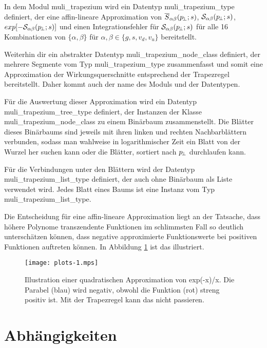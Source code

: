 In dem Modul muli\_trapezium wird ein Datentyp muli\_trapezium\_type definiert, der eine affin-lineare Approximation von $\overline{S}_{\alpha\beta}(p_{\!\perp};s)$, $\mathcal{S}_{\alpha\beta}(p_{\!\perp};s)$, $exp[-\mathcal{S}_{\alpha\beta}(p_{\!\perp};s)]$ und einen Integrationsfehler für $\mathcal{S}_{\alpha\beta}(p_{\!\perp};s)$ für alle 16 Kombinationen von $\{\alpha,\beta\}$ für $\alpha,\beta\in \{g,s,v_d,v_u\}$ bereitstellt.

Weiterhin dir ein abstrakter Datentyp muli\_trapezium\_node\_class definiert, der mehrere Segmente vom Typ muli\_trapezium\_type zusammenfasst und somit eine Approximation der Wirkungsquerschnitte entsprechend der Trapezregel bereitstellt. Daher kommt auch der name des Moduls und der Datentypen.

Für die Auswertung dieser Approximation wird ein Datentyp muli\_trapezium\_tree\_type definiert, der Instanzen der Klasse muli\_trapezium\_node\_class zu einem Binärbaum zusammenstellt. Die Blätter dieses Binärbaums sind jeweils mit ihren linken und rechten Nachbarblättern verbunden, sodass man wahlweise in logarithmischer Zeit ein Blatt von der Wurzel her suchen kann oder die Blätter, sortiert nach $p_{\!\perp}$ durchlaufen kann.

Für die Verbindungen unter den Blättern wird der Datentyp muli\_trapezium\_list\_type definiert, der auch ohne Binärbaum als Liste verwendet wird. Jedes Blatt eines Baums ist eine Instanz vom Typ muli\_trapezium\_list\_type.

Die Entscheidung für eine affin-lineare Approximation liegt an der Tatsache, dass höhere Polynome transzendente Funktionen im schlimmsten Fall so deutlich unterschätzen können, dass negative approximierte Funktionswerte bei positiven Funktionen auftreten können. In Abbildung \ref{fig:tra:parabel} ist das illustriert.
\begin{figure}
  \texttt{[image: plots-1.mps]}
  \caption{\label{fig:tra:parabel}Illustration einer quadratischen Approximation von exp(-x)/x. Die Parabel (blau) wird negativ, obwohl die Funktion (rot) streng positiv ist. Mit der Trapezregel kann das nicht passieren.}
\end{figure}
\section{Abhängigkeiten}
